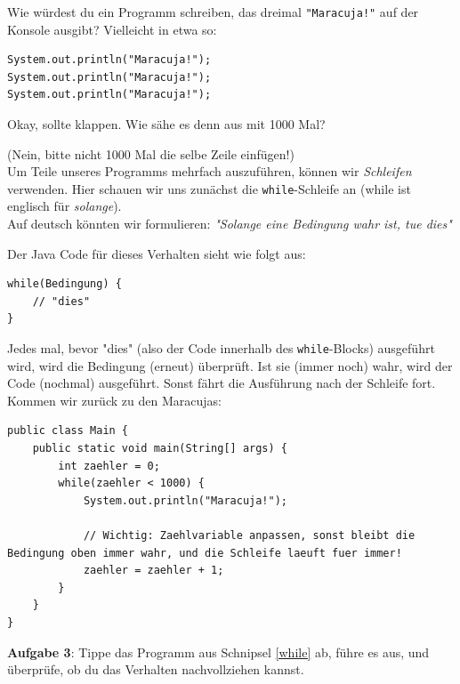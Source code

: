 \documentclass[ngerman,11pt]{article}
\begin{document}
    Wie würdest du ein Programm schreiben, das dreimal \lstinline{"Maracuja!"} auf der Konsole ausgibt?
    Vielleicht in etwa so:

    \begin{lstlisting}
System.out.println("Maracuja!");
System.out.println("Maracuja!");
System.out.println("Maracuja!");
    \end{lstlisting}

    Okay, sollte klappen.
    Wie sähe es denn aus mit 1000 Mal?

    (Nein, bitte nicht 1000 Mal die selbe Zeile einfügen!) \\

    Um Teile unseres Programms mehrfach auszuführen, können wir \textit{Schleifen} verwenden.
    Hier schauen wir uns zunächst die \lstinline{while}-Schleife an (while ist englisch für \textit{solange}). \\

    \newpage
    Auf deutsch könnten wir formulieren: \textit{"Solange eine Bedingung wahr ist, tue dies"}

    Der Java Code für dieses Verhalten sieht wie folgt aus:

    \begin{lstlisting}[caption=\lstinline{while}]
while(Bedingung) {
    // "dies"
}
    \end{lstlisting}

    Jedes mal, bevor "dies" (also der Code innerhalb des \lstinline{while}-Blocks) ausgeführt wird, wird die Bedingung (erneut) überprüft.
    Ist sie (immer noch) wahr, wird der Code (nochmal) ausgeführt.
    Sonst fährt die Ausführung nach der Schleife fort. \\

    Kommen wir zurück zu den Maracujas:

    \begin{lstlisting}[caption=\lstinline{while}, label={while}]
public class Main {
    public static void main(String[] args) {
        int zaehler = 0;
        while(zaehler < 1000) {
            System.out.println("Maracuja!");

            // Wichtig: Zaehlvariable anpassen, sonst bleibt die Bedingung oben immer wahr, und die Schleife laeuft fuer immer!
            zaehler = zaehler + 1;
        }
    }
}
    \end{lstlisting}

    \textbf{Aufgabe 3}: Tippe das Programm aus Schnipsel \ref{while} ab, führe es aus, und überprüfe, ob du das Verhalten nachvollziehen kannst. \\
\end{document}
